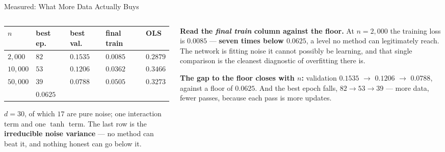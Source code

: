\begin{frame}{Measured: What More Data Actually Buys}
\vspace{-1mm}
\begin{columns}[T]
\begin{column}{0.48\textwidth}
\begin{center}\footnotesize
\begin{tabularx}{\linewidth}{@{}>{\raggedleft\arraybackslash}p{1.1cm} >{\raggedleft\arraybackslash}X >{\raggedleft\arraybackslash}X >{\raggedleft\arraybackslash}X >{\raggedleft\arraybackslash}X@{}}
\toprule
$n$ & \textbf{best ep.} & \textbf{best val.} & \textbf{final train} & \textbf{OLS} \\
\midrule
$2{,}000$ & $82$ & $0.1535$ & $\mathbf{0.0085}$ & $0.2879$ \\
$10{,}000$ & $53$ & $\mathbf{0.1206}$ & $0.0362$ & $0.3466$ \\
$50{,}000$ & $39$ & $0.0788$ & $0.0505$ & $0.3273$ \\
\midrule
\multicolumn{3}{@{}l}{\emph{irreducible noise floor}} & $0.0625$ & \\
\bottomrule
\end{tabularx}
\end{center}
\smallskip
{\footnotesize $d=30$, of which $17$ are pure noise; one interaction term and one $\tanh$ term. The last row is the \textbf{irreducible noise variance} --- no method can beat it, and nothing honest can go below it.}
\end{column}
\begin{column}{0.50\textwidth}
\begin{takeawaybox}\footnotesize
\textbf{Read the \emph{final train} column against the floor.} At $n=2{,}000$ the training loss is $\mathbf{0.0085}$ --- \textbf{seven times below $0.0625$}, a level no method can legitimately reach. The network is fitting noise it cannot possibly be learning, and that single comparison is the cleanest diagnostic of overfitting there is.
\end{takeawaybox}
\smallskip
\begin{conceptbox}\footnotesize
\textbf{The gap to the floor closes with $n$:} validation $0.1535$ $\to$ $0.1206$ $\to$ $0.0788$, against a floor of $0.0625$. And the best epoch falls, $82\to53\to39$ --- more data, fewer passes, because each pass is more updates.
\end{conceptbox}
\end{column}
\end{columns}
\vspace{1mm}
\end{frame}

